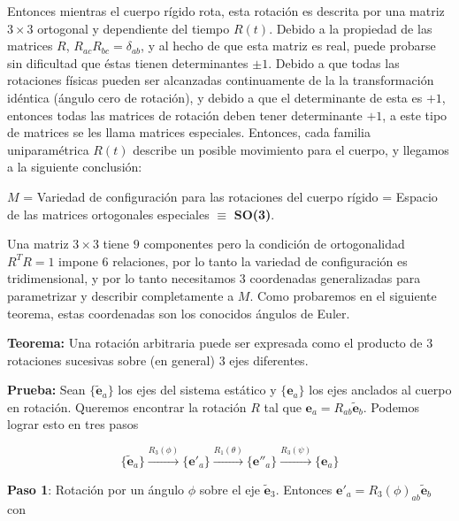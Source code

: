 \documentclass[a4paper,10pt]{article}
\numberwithin{equation}{section}
\newcommand{\teorema}{\textbf{Teorema: }}
\newcommand{\prueba}{\textbf{Prueba: }}
\begin{document}
Entonces mientras el cuerpo rígido rota, esta rotación es descrita por una matriz 
$3\times 3$ ortogonal y dependiente del tiempo $R(t)$. Debido a la propiedad de 
las matrices $R$, $R_{ac}R_{bc} = \delta_{ab}$, y al hecho de que esta matriz es 
real, puede probarse sin dificultad que éstas tienen determinantes $\pm 1$. Debido 
a que todas las rotaciones físicas pueden ser alcanzadas continuamente de la 
la transformación idéntica (ángulo cero de rotación), y debido a que el determinante 
de esta es $+1$, entonces todas las matrices de rotación deben tener determinante $+1$, 
a este tipo de matrices se les llama matrices especiales. Entonces, cada familia uniparamétrica $R(t)$ describe un posible movimiento para 
el cuerpo, y llegamos a la siguiente conclusión:

\begin{center}
 $M$ = Variedad de configuración para  las rotaciones del cuerpo rígido = Espacio de las matrices 
 ortogonales especiales $\equiv$ \textbf{SO(3)}.
\end{center}

\vspace{.3cm}

Una matriz $3\times 3$ tiene $9$ componentes pero la condición de ortogonalidad $R^TR=1$
impone $6$ relaciones, por lo tanto la variedad de configuración es tridimensional, y 
por lo tanto necesitamos $3$ coordenadas generalizadas para parametrizar y describir 
completamente a $M$. Como probaremos en el siguiente teorema, estas coordenadas son 
los conocidos ángulos de Euler.

\teorema Una rotación arbitraria puede ser expresada como el producto de $3$ rotaciones 
sucesivas sobre (en general) $3$ ejes diferentes.

\vspace{.3cm}

\prueba Sean $\{{\tilde{\mathbf{e}}_a\}}$ los ejes del sistema estático y 
$\{{\mathbf{e}_a\}}$ los ejes anclados al cuerpo en rotación. Queremos encontrar 
la rotación $R$ tal que $\mathbf{e}_a = R_{ab}{\tilde{\mathbf{e}}_b}$. Podemos 
lograr esto en tres pasos

\begin{equation}
 \{{\tilde{\mathbf{e}}_a\}} \xrightarrow{R_3(\phi)} 
 \{{\mathbf{e}'_a\}} \xrightarrow{R_1(\theta)} 
 \{{\mathbf{e}''_a\}} \xrightarrow{R_3(\psi)} \{{\mathbf{e}_a\}}
\end{equation}

\textbf{Paso 1}: Rotación por un ángulo $\phi$ sobre el eje $\tilde{\mathbf{e}}_3$. 
Entonces $\mathbf{e}'_a = R_3(\phi)_{ab}\tilde{\mathbf{e}}_b$ con 
\end{document}
